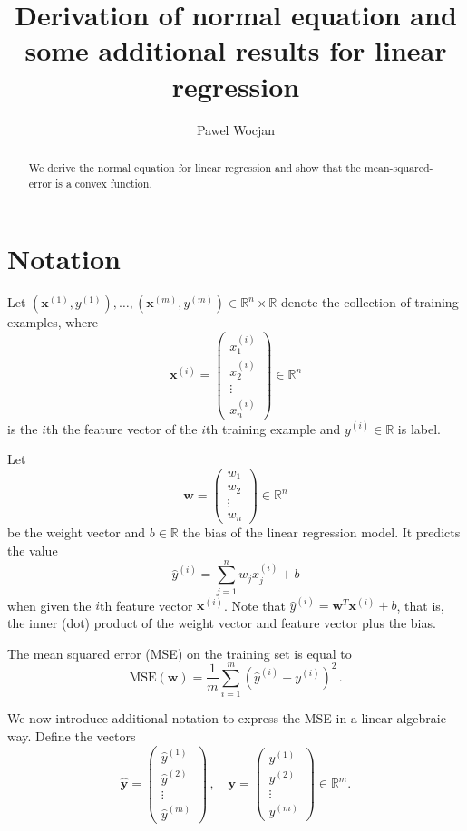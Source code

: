 \documentclass[12pt]{article}
\title{Derivation of normal equation and some additional results for linear regression}
\author{Pawel Wocjan}
\newcommand{\R}{\mathbb{R}}
\newcommand{\x}{\boldsymbol{x}}
\newcommand{\y}{\boldsymbol{y}}
\newcommand{\yh}{\hat{\boldsymbol{y}}}
\newcommand{\w}{\boldsymbol{w}}
\newcommand{\mse}{\mathrm{MSE}}
\begin{document}
\maketitle


\begin{abstract}
We derive the normal equation for linear regression and show that the mean-squared-error is a convex function.
\end{abstract}

\section{Notation}

Let $(\x^{(1)}, y^{(1)}),\ldots,(\x^{(m)},y^{(m)})\in\R^n\times\R$ denote the collection of training examples, where
\[
\x^{(i)} = 
\left(
\begin{array}{c}
x^{(i)}_1 \\
x^{(i)}_2 \\
\vdots \\
x^{(i)}_n
\end{array}
\right)
\in\R^n
\]
is the $i$th the feature vector of the $i$th training example and $y^{(i)}\in\R$ is label.

Let 
\[
\w=
\left(
\begin{array}{c}
w_1 \\
w_2 \\
\vdots \\
w_n
\end{array}
\right)\in\R^n
\] 
be the weight vector and $b\in\R$ the bias of the linear regression model. It predicts the value
\[
\hat{y}^{(i)}= \sum_{j=1}^n w_j x_j^{(i)} + b
\] 
when given the $i$th feature vector $\x^{(i)}$.  Note that $\hat{y}^{(i)} = \w^T \x^{(i)} + b$, that is, the inner (dot) product of the weight vector and feature vector plus the bias. 

The mean squared error (MSE) on the training set is equal to
\[
\mse (\w) = \frac{1}{m} \sum_{i=1}^m (\hat{y}^{(i)} - y^{(i)})^2 \,.
\]

We now introduce additional notation to express the MSE in a linear-algebraic way. Define the vectors
\[
\yh = \left(
\begin{array}{c}
\hat{y}^{(1)} \\
\hat{y}^{(2)} \\
\vdots \\
\hat{y}^{(m)}
\end{array}
\right)\,,
\quad
\y = \left(
\begin{array}{c}
    y^{(1)} \\
    y^{(2)} \\
    \vdots  \\
    y^{(m)}
\end{array}
\right) \in \R^m.
\]
\end{document}
